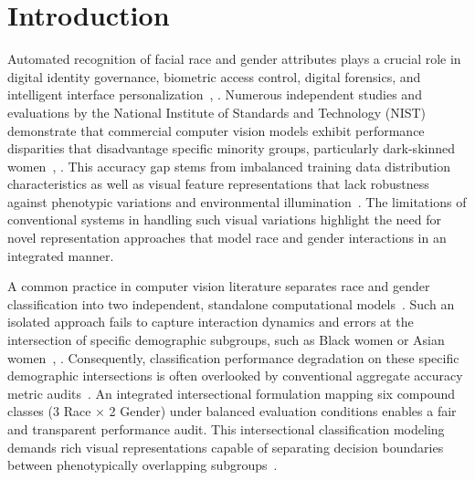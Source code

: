 \section{Introduction}
\label{sec:introduction}

Automated recognition of facial race and gender attributes plays a crucial role in digital identity governance, biometric access control, digital forensics, and intelligent interface personalization~\cite{ref1}, \cite{ref2}. Numerous independent studies and evaluations by the National Institute of Standards and Technology (NIST) demonstrate that commercial computer vision models exhibit performance disparities that disadvantage specific minority groups, particularly dark-skinned women~\cite{ref3}, \cite{ref4}. This accuracy gap stems from imbalanced training data distribution characteristics as well as visual feature representations that lack robustness against phenotypic variations and environmental illumination~\cite{ref5}. The limitations of conventional systems in handling such visual variations highlight the need for novel representation approaches that model race and gender interactions in an integrated manner.

A common practice in computer vision literature separates race and gender classification into two independent, standalone computational models~\cite{ref6}. Such an isolated approach fails to capture interaction dynamics and errors at the intersection of specific demographic subgroups, such as Black women or Asian women~\cite{ref7}, \cite{ref8}. Consequently, classification performance degradation on these specific demographic intersections is often overlooked by conventional aggregate accuracy metric audits~\cite{ref9}. An integrated intersectional formulation mapping six compound classes (3 Race $\times$ 2 Gender) under balanced evaluation conditions enables a fair and transparent performance audit. This intersectional classification modeling demands rich visual representations capable of separating decision boundaries between phenotypically overlapping subgroups~\cite{ref10}.

